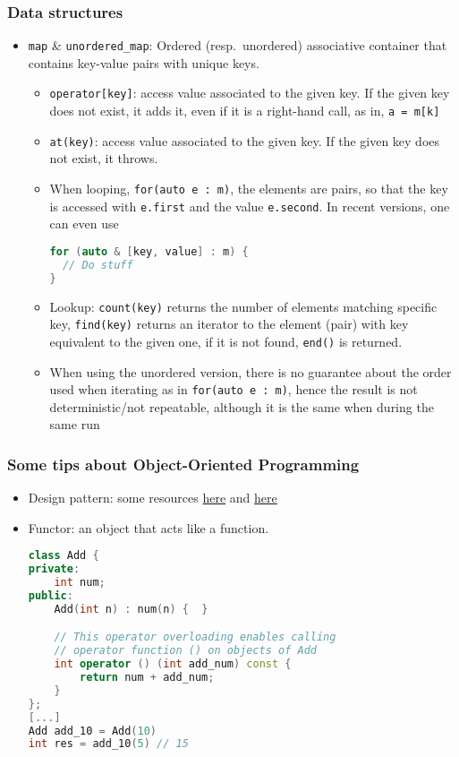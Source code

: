 \documentclass[a4paper,12pt,%
              final%
              ]{article}
\begin{document}
\subsubsection{Data structures}
\begin{itemize}
  \item \verb|map| \& \verb|unordered_map|: Ordered (resp.\ unordered) associative container that contains key-value pairs with unique keys.
    \begin{itemize}
      \item \verb|operator[key]|: access value associated to the given key. If the given key does not exist, it adds it, even if it is a right-hand call, as in, \verb|a = m[k]|
      \item \verb|at(key)|: access value associated to the given key. If the given key does not exist, it throws.
      \item When looping, \verb|for(auto e : m)|, the elements are pairs, so that the key is accessed with \verb|e.first| and the value \verb|e.second|. In recent versions, one can even use
        \begin{lstlisting}[language=C++]
for (auto & [key, value] : m) {
  // Do stuff
}
        \end{lstlisting}
      \item Lookup: \verb|count(key)| returns the number of elements matching specific key, \verb|find(key)| returns an iterator to the element (pair) with key equivalent to the given one, if it is not found, \verb|end()| is returned.
      \item When using the unordered version, there is no guarantee about the order used when iterating as in \verb|for(auto e : m)|, hence the result is not deterministic/not repeatable, although it is the same when during the same run
    \end{itemize}
\end{itemize}

\subsubsection{Some tips about Object-Oriented Programming}
\begin{itemize}
  \item Design pattern: some resources \href{https://www.tutorialspoint.com/design_pattern/design_pattern_overview.htm}{here} and \href{https://sourcemaking.com/design_patterns}{here}
  \item Functor: an object that acts like a function.
    \begin{lstlisting}[language=C++]
class Add {
private:
    int num;
public:
    Add(int n) : num(n) {  }

    // This operator overloading enables calling
    // operator function () on objects of Add
    int operator () (int add_num) const {
        return num + add_num;
    }
};
[...]
Add add_10 = Add(10)
int res = add_10(5) // 15
    \end{lstlisting}
\end{itemize}
\end{document}
